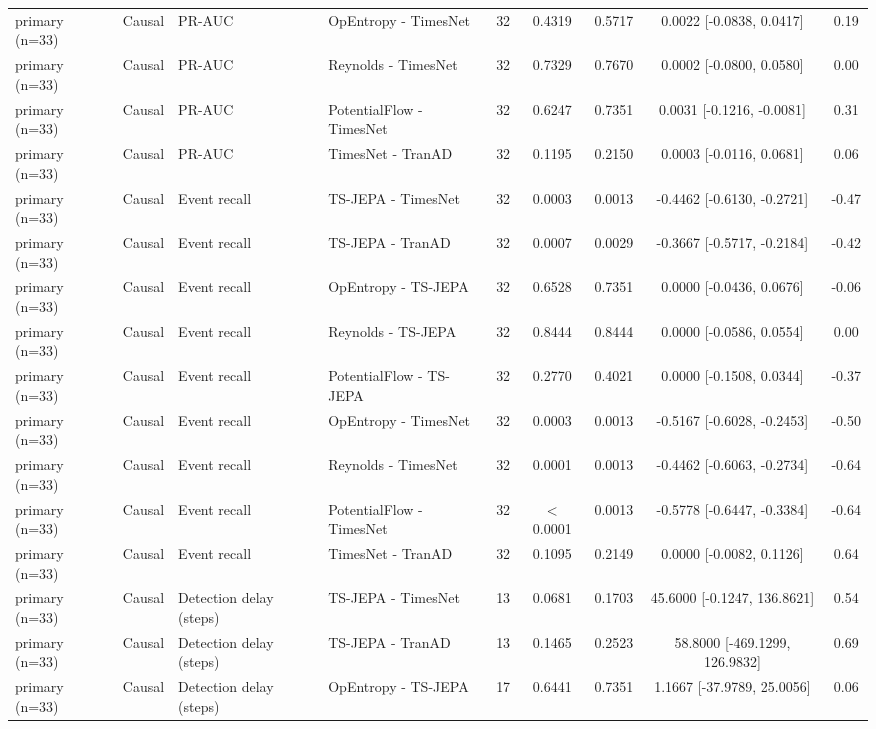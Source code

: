 \begin{table}[t]
\begin{tabular}{@{}llllccccc@{}}
primary (n=33) & Causal & PR-AUC & OpEntropy - TimesNet & 32 & 0.4319 & 0.5717 & 0.0022 [-0.0838, 0.0417] & 0.19 \\
primary (n=33) & Causal & PR-AUC & Reynolds - TimesNet & 32 & 0.7329 & 0.7670 & 0.0002 [-0.0800, 0.0580] & 0.00 \\
primary (n=33) & Causal & PR-AUC & PotentialFlow - TimesNet & 32 & 0.6247 & 0.7351 & 0.0031 [-0.1216, -0.0081] & 0.31 \\
primary (n=33) & Causal & PR-AUC & TimesNet - TranAD & 32 & 0.1195 & 0.2150 & 0.0003 [-0.0116, 0.0681] & 0.06 \\
primary (n=33) & Causal & Event recall & TS-JEPA - TimesNet & 32 & 0.0003 & 0.0013 & -0.4462 [-0.6130, -0.2721] & -0.47 \\
primary (n=33) & Causal & Event recall & TS-JEPA - TranAD & 32 & 0.0007 & 0.0029 & -0.3667 [-0.5717, -0.2184] & -0.42 \\
primary (n=33) & Causal & Event recall & OpEntropy - TS-JEPA & 32 & 0.6528 & 0.7351 & 0.0000 [-0.0436, 0.0676] & -0.06 \\
primary (n=33) & Causal & Event recall & Reynolds - TS-JEPA & 32 & 0.8444 & 0.8444 & 0.0000 [-0.0586, 0.0554] & 0.00 \\
primary (n=33) & Causal & Event recall & PotentialFlow - TS-JEPA & 32 & 0.2770 & 0.4021 & 0.0000 [-0.1508, 0.0344] & -0.37 \\
primary (n=33) & Causal & Event recall & OpEntropy - TimesNet & 32 & 0.0003 & 0.0013 & -0.5167 [-0.6028, -0.2453] & -0.50 \\
primary (n=33) & Causal & Event recall & Reynolds - TimesNet & 32 & 0.0001 & 0.0013 & -0.4462 [-0.6063, -0.2734] & -0.64 \\
primary (n=33) & Causal & Event recall & PotentialFlow - TimesNet & 32 & $<$0.0001 & 0.0013 & -0.5778 [-0.6447, -0.3384] & -0.64 \\
primary (n=33) & Causal & Event recall & TimesNet - TranAD & 32 & 0.1095 & 0.2149 & 0.0000 [-0.0082, 0.1126] & 0.64 \\
primary (n=33) & Causal & Detection delay (steps) & TS-JEPA - TimesNet & 13 & 0.0681 & 0.1703 & 45.6000 [-0.1247, 136.8621] & 0.54 \\
primary (n=33) & Causal & Detection delay (steps) & TS-JEPA - TranAD & 13 & 0.1465 & 0.2523 & 58.8000 [-469.1299, 126.9832] & 0.69 \\
primary (n=33) & Causal & Detection delay (steps) & OpEntropy - TS-JEPA & 17 & 0.6441 & 0.7351 & 1.1667 [-37.9789, 25.0056] & 0.06 \\

\end{tabular}
\end{table}
